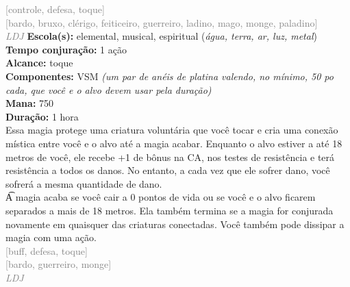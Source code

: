 \documentclass{RPG_Adventure}[2021/10/20]
\begin{document}
{\scriptsize \textcolor{gray}{[controle, defesa, toque]\\}}
{\scriptsize \textcolor{gray}{[bardo, bruxo, clérigo, feiticeiro, guerreiro, ladino, mago, monge, paladino]\\}}
{\tiny \textcolor{gray}{\textit{LDJ}}}\jump{}
{\small \t \textbf{Escola(s):} elemental, musical, espiritual (\textit{água, terra, ar, luz, metal})\\\t \textbf{Tempo conjuração:} 1 ação\\\t \textbf{Alcance:} toque\\\t \textbf{Componentes:} VSM \textit{(um par de anéis de platina valendo, no mínimo, 50 po cada, que você e o alvo devem usar pela duração)}\\\t \textbf{Mana:} 750\\\t \textbf{Duração:} 1 hora\\}
{\normalsize Essa magia protege uma criatura voluntária que você tocar e cria uma conexão mística entre você e o alvo até a magia acabar. Enquanto o alvo estiver a até 18 metros de você, ele recebe +1 de bônus na CA, nos testes de resistência e terá resistência a todos os danos. No entanto, a cada vez que ele sofrer dano, você sofrerá a mesma quantidade de dano.\\\t A magia acaba se você cair a 0 pontos de vida ou se você e o alvo ficarem separados a mais de 18 metros. Ela também termina se a magia for conjurada novamente em quaisquer das criaturas conectadas. Você também pode dissipar a magia com uma ação.\\}
{\scriptsize \textcolor{gray}{[buff, defesa, toque]\\}}
{\scriptsize \textcolor{gray}{[bardo, guerreiro, monge]\\}}
{\tiny \textcolor{gray}{\textit{LDJ}}}\jump

\end{document}

